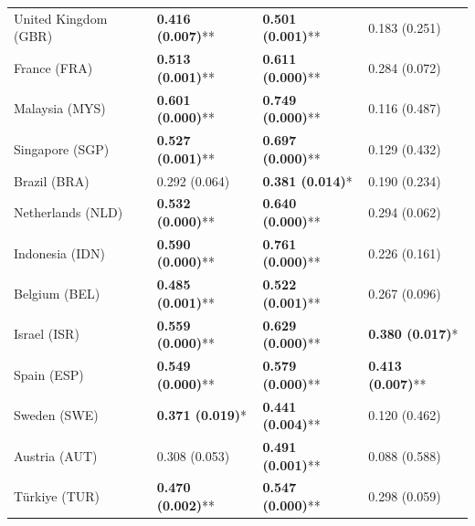 \begin{longtable}{p{5cm}p{3cm}p{3cm}p{5cm}}
United Kingdom (GBR) & \textcolor{atlLime600}{\textbf{0.416 (0.007)}**} & \textcolor{atlLime600}{\textbf{0.501 (0.001)}**} & \textcolor{atlOrange600}{0.183 (0.251)} \\
France (FRA) & \textcolor{atlLime600}{\textbf{0.513 (0.001)}**} & \textcolor{atlLime600}{\textbf{0.611 (0.000)}**} & \textcolor{atlOrange600}{0.284 (0.072)} \\
Malaysia (MYS) & \textcolor{atlLime600}{\textbf{0.601 (0.000)}**} & \textcolor{atlLime600}{\textbf{0.749 (0.000)}**} & \textcolor{atlOrange600}{0.116 (0.487)} \\
Singapore (SGP) & \textcolor{atlLime600}{\textbf{0.527 (0.001)}**} & \textcolor{atlLime600}{\textbf{0.697 (0.000)}**} & \textcolor{atlOrange600}{0.129 (0.432)} \\
Brazil (BRA) & \textcolor{atlOrange600}{0.292 (0.064)} & \textcolor{atlLime600}{\textbf{0.381 (0.014)}*} & \textcolor{atlOrange600}{0.190 (0.234)} \\
Netherlands (NLD) & \textcolor{atlLime600}{\textbf{0.532 (0.000)}**} & \textcolor{atlLime600}{\textbf{0.640 (0.000)}**} & \textcolor{atlOrange600}{0.294 (0.062)} \\
Indonesia (IDN) & \textcolor{atlLime600}{\textbf{0.590 (0.000)}**} & \textcolor{atlLime600}{\textbf{0.761 (0.000)}**} & \textcolor{atlOrange600}{0.226 (0.161)} \\
Belgium (BEL) & \textcolor{atlLime600}{\textbf{0.485 (0.001)}**} & \textcolor{atlLime600}{\textbf{0.522 (0.001)}**} & \textcolor{atlOrange600}{0.267 (0.096)} \\
Israel (ISR) & \textcolor{atlLime600}{\textbf{0.559 (0.000)}**} & \textcolor{atlLime600}{\textbf{0.629 (0.000)}**} & \textcolor{atlLime600}{\textbf{0.380 (0.017)}*} \\
Spain (ESP) & \textcolor{atlLime600}{\textbf{0.549 (0.000)}**} & \textcolor{atlLime600}{\textbf{0.579 (0.000)}**} & \textcolor{atlLime600}{\textbf{0.413 (0.007)}**} \\
Sweden (SWE) & \textcolor{atlLime600}{\textbf{0.371 (0.019)}*} & \textcolor{atlLime600}{\textbf{0.441 (0.004)}**} & \textcolor{atlOrange600}{0.120 (0.462)} \\
Austria (AUT) & \textcolor{atlOrange600}{0.308 (0.053)} & \textcolor{atlLime600}{\textbf{0.491 (0.001)}**} & \textcolor{atlOrange600}{0.088 (0.588)} \\
Türkiye (TUR) & \textcolor{atlLime600}{\textbf{0.470 (0.002)}**} & \textcolor{atlLime600}{\textbf{0.547 (0.000)}**} & \textcolor{atlOrange600}{0.298 (0.059)} \\

\end{longtable}
